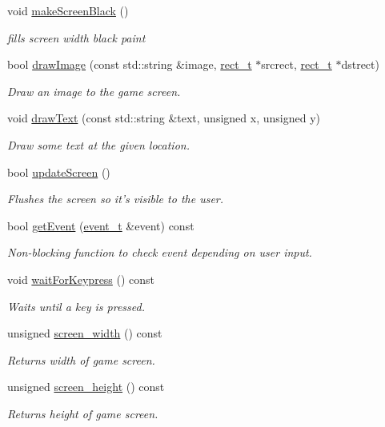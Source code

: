 \begin{DoxyCompactItemize}
void \hyperlink{classGraphicsEngine_a3fd7c49d0ddd1b7766eea44af1d59ea0}{make\-Screen\-Black} ()
\begin{DoxyCompactList}\small\item\em fills screen width black paint \end{DoxyCompactList}\item 
bool \hyperlink{classGraphicsEngine_a47be08aa9a766dce3b32b6814fb5b6ed}{draw\-Image} (const std\-::string \&image, \hyperlink{GraphicsEngine_8hh_a9a150f1ad43ec7de65cfe698cdae8bee}{rect\-\_\-t} $\ast$srcrect, \hyperlink{GraphicsEngine_8hh_a9a150f1ad43ec7de65cfe698cdae8bee}{rect\-\_\-t} $\ast$dstrect)
\begin{DoxyCompactList}\small\item\em Draw an image to the game screen. \end{DoxyCompactList}\item 
void \hyperlink{classGraphicsEngine_a82d4584abba7fd03c321a3e418964cac}{draw\-Text} (const std\-::string \&text, unsigned x, unsigned y)
\begin{DoxyCompactList}\small\item\em Draw some text at the given location. \end{DoxyCompactList}\item 
bool \hyperlink{classGraphicsEngine_aeadd04c5518ef05b039241cbb7d09b59}{update\-Screen} ()
\begin{DoxyCompactList}\small\item\em Flushes the screen so it's visible to the user. \end{DoxyCompactList}\item 
bool \hyperlink{classGraphicsEngine_acdcf6935481bebcc5f45e7fd18dcf016}{get\-Event} (\hyperlink{GraphicsEngine_8hh_a2fb9b58e4e5f14f40af8b4a1425841f8}{event\-\_\-t} \&event) const 
\begin{DoxyCompactList}\small\item\em Non-\/blocking function to check event depending on user input. \end{DoxyCompactList}\item 
void \hyperlink{classGraphicsEngine_a4fe915afad2a770445f34ad1f597474a}{wait\-For\-Keypress} () const 
\begin{DoxyCompactList}\small\item\em Waits until a key is pressed. \end{DoxyCompactList}\item 
unsigned \hyperlink{classGraphicsEngine_a7598618ef7de1ba7813e41471938f2c1}{screen\-\_\-width} () const 
\begin{DoxyCompactList}\small\item\em Returns width of game screen. \end{DoxyCompactList}\item 
unsigned \hyperlink{classGraphicsEngine_af7d7440d76fda157dae03aabc9388a83}{screen\-\_\-height} () const 
\begin{DoxyCompactList}\small\item\em Returns height of game screen. \end{DoxyCompactList}\end{DoxyCompactItemize}
